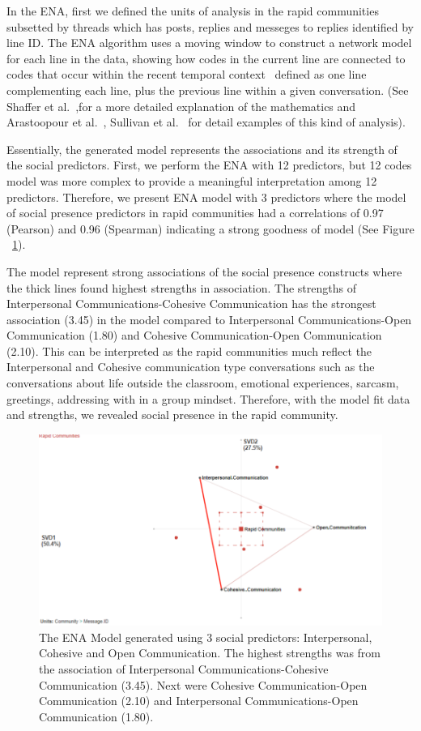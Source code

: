 \documentclass[manuscript,screen,review]{acmart}
\begin{document}
In the ENA, first we defined the units of analysis in the rapid communities subsetted by threads which has posts, replies and messeges to replies identified by line ID. The ENA algorithm uses a moving window to construct a network model for each line in the data, showing how codes in the current line are connected to codes that occur within the recent temporal context~\cite{siebert2017search} defined as one line complementing each line, plus the previous line within a given conversation. (See  Shaffer et al.~\cite{shaffer2016tutorial},for a more detailed explanation of the mathematics and Arastoopour et al.~\cite{arastoopour2015epistemic}, Sullivan et al.~\cite{sullivan2018using} for detail examples of this kind of analysis). 

Essentially, the generated model represents the associations and its strength of the social predictors. First, we perform the ENA with 12 predictors, but 12 codes model was more complex to provide a meaningful interpretation among 12 predictors. Therefore, we present ENA model with 3 predictors where the model of social presence predictors in rapid communities had a correlations of 0.97 (Pearson) and 0.96 (Spearman) indicating a strong goodness of model (See Figure ~\ref{fig:primary}).

The model represent strong associations of the social presence constructs where the thick lines found highest strengths in association. The strengths of Interpersonal Communications-Cohesive Communication has the strongest association (3.45) in the model compared to Interpersonal Communications-Open Communication (1.80) and Cohesive Communication-Open Communication (2.10). This can be interpreted as the rapid communities much reflect the Interpersonal and Cohesive communication type conversations such as the conversations about life outside the classroom, emotional experiences, sarcasm, greetings, addressing with in a group mindset. Therefore, with the model fit data and strengths, we revealed social presence in the rapid community. 
\begin{figure}[h]
  \centering
  \includegraphics[width=\linewidth]{images/ENASocialP.png}
  \caption{The ENA Model generated using 3 social predictors: Interpersonal, Cohesive and Open Communication. The highest  strengths was from the association of Interpersonal Communications-Cohesive Communication (3.45). Next were Cohesive Communication-Open Communication (2.10) and Interpersonal Communications-Open Communication (1.80).   }
 \label{fig:primary}
\end{figure}
\end{document}

